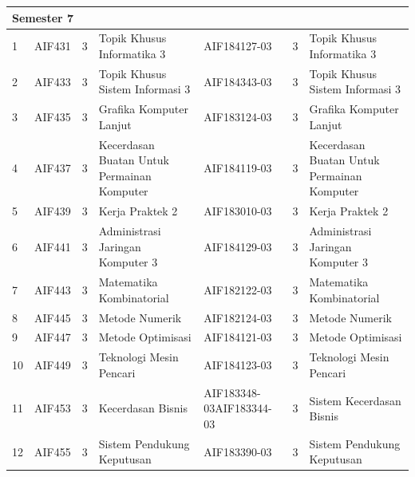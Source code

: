 \begin{table}[H]
\begin{tabular}{|p{0.35cm}|p{2cm}|p{0.55cm}|p{3.45cm}|p{2.65cm}|p{0.55cm}|p{3.45cm}|}
\multicolumn{7}{|l|}{\textbf{Semester 7}}         \\ \hline
1  & AIF431 &  3 & Topik Khusus Informatika 3  & AIF184127-03 & 3  & Topik Khusus Informatika 3  \\ \hline
2  & AIF433 &  3 & Topik Khusus Sistem Informasi 3 & AIF184343-03  & 3 & Topik Khusus Sistem Informasi 3 \\ \hline
3  & AIF435 & 3 & Grafika Komputer Lanjut  & AIF183124-03 & 3 & Grafika Komputer Lanjut  \\ \hline
4  & AIF437 &  3 & Kecerdasan Buatan Untuk Permainan Komputer & AIF184119-03 & 3 & Kecerdasan Buatan Untuk Permainan Komputer \\ \hline
5  & AIF439 &  3 & Kerja Praktek 2 & AIF183010-03 & 3 & Kerja Praktek 2 \\ \hline
6  & AIF441 &  3 & Administrasi Jaringan Komputer 3 & AIF184129-03 & 3 & Administrasi Jaringan Komputer 3   \\ \hline
7  & AIF443 &  3 & Matematika Kombinatorial & AIF182122-03 & 3 & Matematika Kombinatorial  \\ \hline
8  & AIF445  &  3 & Metode Numerik & AIF182124-03 & 3 & Metode Numerik   \\ \hline
9  & AIF447  &  3 & Metode Optimisasi & AIF184121-03 & 3 & Metode Optimisasi   \\ \hline
10 & AIF449  &  3 & Teknologi Mesin Pencari & AIF184123-03 & 3 & Teknologi Mesin Pencari  \\ \hline
11 & AIF453 &  3 & Kecerdasan Bisnis & AIF183348-03AIF183344-03 & 3 & Sistem Kecerdasan Bisnis  \\ \hline
12 & AIF455 & 3 & Sistem Pendukung Keputusan & AIF183390-03 & 3 & Sistem Pendukung Keputusan   \\ \hline
\end{tabular}
\end{table}

